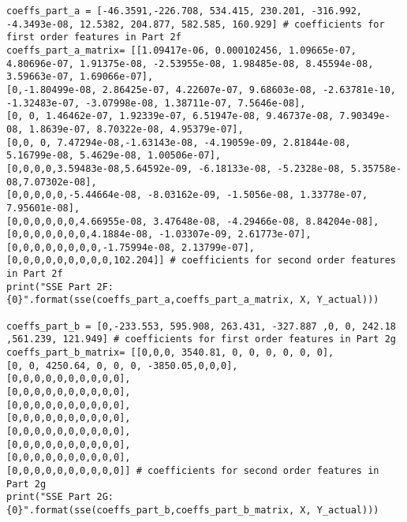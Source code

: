 \documentclass[15pt,a4paper,openright]{article}
\begin{document}
\begin{lstlisting}[language=AMPL, caption=2h Code]
coeffs_part_a = [-46.3591,-226.708, 534.415, 230.201, -316.992, -4.3493e-08, 12.5382, 204.877, 582.585, 160.929] # coefficients for first order features in Part 2f
coeffs_part_a_matrix= [[1.09417e-06, 0.000102456, 1.09665e-07, 4.80696e-07, 1.91375e-08, -2.53955e-08, 1.98485e-08, 8.45594e-08, 3.59663e-07, 1.69066e-07],
[0,-1.80499e-08, 2.86425e-07, 4.22607e-07, 9.68603e-08, -2.63781e-10, -1.32483e-07, -3.07998e-08, 1.38711e-07, 7.5646e-08],
[0, 0, 1.46462e-07, 1.92339e-07, 6.51947e-08, 9.46737e-08, 7.90349e-08, 1.8639e-07, 8.70322e-08, 4.95379e-07],
[0,0, 0, 7.47294e-08,-1.63143e-08, -4.19059e-09, 2.81844e-08, 5.16799e-08, 5.4629e-08, 1.00506e-07],
[0,0,0,0,3.59483e-08,5.64592e-09, -6.18133e-08, -5.2328e-08, 5.35758e-08,7.07302e-08],
[0,0,0,0,0,-5.44664e-08, -8.03162e-09, -1.5056e-08, 1.33778e-07, 7.95601e-08],
[0,0,0,0,0,0,4.66955e-08, 3.47648e-08, -4.29466e-08, 8.84204e-08],
[0,0,0,0,0,0,0,4.1884e-08, -1.03307e-09, 2.61773e-07],
[0,0,0,0,0,0,0,0,-1.75994e-08, 2.13799e-07],
[0,0,0,0,0,0,0,0,0,102.204]] # coefficients for second order features in Part 2f
print("SSE Part 2F: {0}".format(sse(coeffs_part_a,coeffs_part_a_matrix, X, Y_actual)))                        

coeffs_part_b = [0,-233.553, 595.908, 263.431, -327.887 ,0, 0, 242.18 ,561.239, 121.949] # coefficients for first order features in Part 2g
coeffs_part_b_matrix= [[0,0,0, 3540.81, 0, 0, 0, 0, 0, 0],
[0, 0, 4250.64, 0, 0, 0, -3850.05,0,0,0],
[0,0,0,0,0,0,0,0,0,0],
[0,0,0,0,0,0,0,0,0,0],
[0,0,0,0,0,0,0,0,0,0],
[0,0,0,0,0,0,0,0,0,0],
[0,0,0,0,0,0,0,0,0,0],
[0,0,0,0,0,0,0,0,0,0],
[0,0,0,0,0,0,0,0,0,0],
[0,0,0,0,0,0,0,0,0,0]] # coefficients for second order features in Part 2g
print("SSE Part 2G: {0}".format(sse(coeffs_part_b,coeffs_part_b_matrix, X, Y_actual)))
\end{lstlisting}
\end{document}
